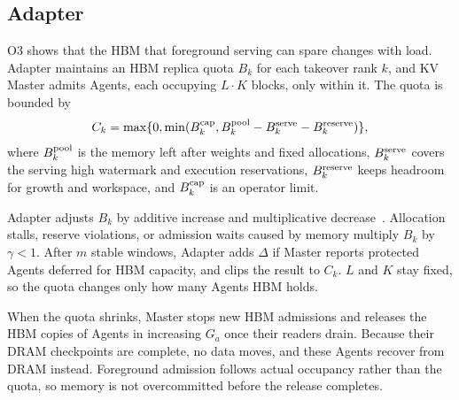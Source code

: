 \subsection{Adapter}
\label{sec:capacity}

O3 shows that the HBM that foreground serving can spare changes with
load. Adapter maintains an HBM replica quota $B_k$ for each takeover rank
$k$, and KV Master admits Agents, each occupying $L\cdot K$ blocks, only
within it. The quota is bounded by
\begin{equation}
 C_k=\max\{0,\min(B^{\rm cap}_k,
 B^{\rm pool}_k-B^{\rm serve}_k-B^{\rm reserve}_k)\},
 \label{eq:ceiling}
\end{equation}
where $B^{\rm pool}_k$ is the memory left after weights and fixed
allocations, $B^{\rm serve}_k$ covers the serving high watermark and
execution reservations, $B^{\rm reserve}_k$ keeps headroom for growth and
workspace, and $B^{\rm cap}_k$ is an operator limit.

Adapter adjusts $B_k$ by additive increase and multiplicative
decrease~\cite{chiu1989aimd}. Allocation stalls, reserve violations, or
admission waits caused by memory multiply $B_k$ by $\gamma<1$. After $m$
stable windows, Adapter adds $\Delta$ if Master reports protected Agents
deferred for HBM capacity, and clips the result to $C_k$. $L$ and $K$ stay
fixed, so the quota changes only how many Agents HBM holds.

When the quota shrinks, Master stops new HBM admissions and releases the
HBM copies of Agents in increasing $G_a$ once their readers
drain. Because their DRAM checkpoints are complete, no data moves, and
these Agents recover from DRAM instead. Foreground admission follows
actual occupancy rather than the quota, so memory is not overcommitted
before the release completes.
